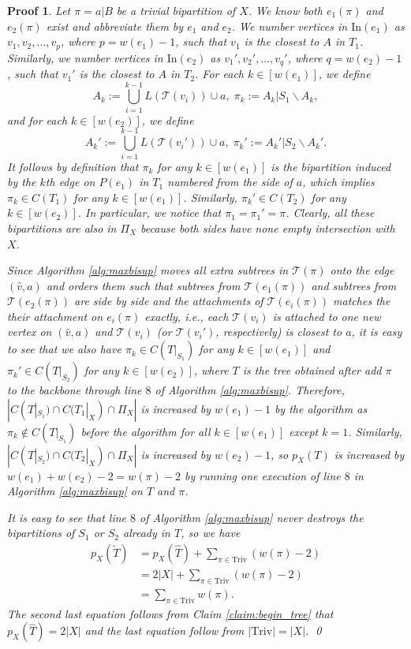 \documentclass[twocolumn]{bmcart}%
\newcommand{\In}{\mathrm{In}}
\newcommand{\triv}{\mathrm{Triv}}
\theoremstyle{mystyle}
\theoremstyle{proofstyle}
\newtheorem*{proof2}{Proof}
\newenvironment{proofnospace}{\begin{proof2}}{\qed \end{proof2}}
\begin{document}
\claimAfterAddTrivial*
\begin{proofnospace}
    Let $\pi = a|B$ be a trivial bipartition of $X$. We know both $e_1(\pi)$ and $e_2(\pi)$ exist and abbreviate them by $e_1$ and $e_2$. We number vertices in $\In(e_1)$ as $v_1, v_2, \dots, v_p$, where $p = w(e_1)-1$, such that $v_1$ is the closest to $A$ in $T_1$. Similarly, we number vertices in $\In(e_2)$ as $v_1', v_2', \dots, v_q'$, where $q = w(e_2)-1$, such that $v_1'$ is the closest to $A$ in $T_2$. For each $k \in [w(e_1)]$, we define
    \[A_k := \bigcup_{i = 1}^{k-1} L(\mathcal{T}(v_i)) \cup a, \; \pi_k := A_k | S_1 \backslash A_k,\]
    and for each $k \in [w(e_2)]$, we define
    \[A_k' := \bigcup_{i = 1}^{k-1} L(\mathcal{T}(v_i')) \cup a,\; \pi_k' := A_k' | S_2 \backslash A_k'.\]
    It follows by definition that $\pi_k$ for any $k \in [w(e_1)]$ is the bipartition induced by the $k$th edge on $P(e_1)$ in $T_1$ numbered from the side of $a$, which implies $\pi_k \in C(T_1)$ for any $k \in [w(e_1)]$. Similarly, $\pi_k' \in C(T_2)$ for any $k\in[w(e_2)]$. In particular, we notice that $\pi_1 = \pi_1' = \pi$. Clearly, all these bipartitions are also in $\Pi_X$ because both sides have none empty intersection with $X$.

    Since Algorithm \ref{alg:maxbisup} moves all extra subtrees in $\mathcal{T}(\pi)$ onto the edge $(\hat{v},a)$ and orders them such that subtrees from $\mathcal{T}(e_1(\pi))$ and subtrees from $\mathcal{T}(e_2(\pi))$ are side by side and the attachments of $\mathcal{T}(e_i(\pi))$ matches the their attachment on $e_i(\pi)$ exactly, i.e., each $\mathcal{T}(v_i)$ is attached to one new vertex on $(\hat{v},a)$ and $\mathcal{T}(v_i)$ (or $\mathcal{T}(v_i')$, respectively) is closest to $a$, it is easy to see that we also have $\pi_k \in C(T|_{S_1})$ for any $k \in [w(e_1)]$ and $\pi_k' \in C(T|_{S_2})$ for any $k \in [w(e_2)]$, where $T$ is the tree obtained after add $\pi$ to the backbone through line $8$ of Algorithm \ref{alg:maxbisup}. Therefore, $|C(T|_{S_1}) \cap C(T_1|_X) \cap \Pi_X|$ is increased by $w(e_1)-1$ by the algorithm as $\pi_k \notin C(T|_{S_1})$ before the algorithm for all $k \in [w(e_1)]$ except $k=1$. Similarly, $|C(T|_{S_2}) \cap C(T_2|_X) \cap \Pi_X|$ is increased by $w(e_2)-1$, so $p_X(T)$ is increased by $w(e_1)+w(e_2)-2 = w(\pi)-2$ by running one execution of line $8$ in Algorithm \ref{alg:maxbisup} on $T$ and $\pi$. 
    
    It is easy to see that line $8$ of Algorithm \ref{alg:maxbisup} never destroys the bipartitions of $S_1$ or $S_2$ already in $T$, so we have \begin{align*}
        p_X(\tilde{T}) &= p_X(\hat{T}) + \sum_{\pi \in \triv} (w(\pi) -2) \\
        &= 2|X| + \sum_{\pi \in \triv} (w(\pi) - 2) \\
        &= \sum_{\pi \in \triv} w(\pi).
    \end{align*} The second last equation follows from Claim \ref{claim:begin_tree} that $p_X(\hat{T}) = 2|X|$ and the last equation follow from $|\triv| = |X|$.
\end{proofnospace}
\end{document}
